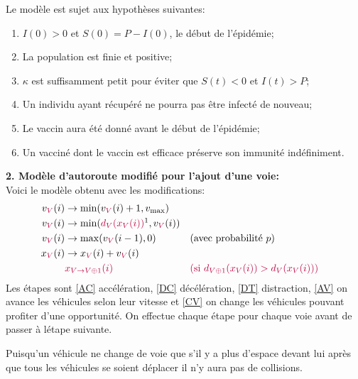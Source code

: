 \documentclass[12pt,leqno]{article}
\newcommand\modif{\color{purple}}
\begin{document}
\noindent
Le mod\`ele est sujet aux hypoth\`eses suivantes:
\begin{enumerate}
    \item $I(0) > 0$ et $S(0) = P-I(0)$, le d\'ebut de l'\'epid\'emie;
    \item La population est finie et positive;
    \item $\kappa$ est suffisamment petit pour \'eviter que $S(t) < 0$ et $I(t) > P$;
    \item Un individu ayant r\'ecup\'er\'e ne pourra pas \^etre infect\'e de nouveau;
    \modif\item Le vaccin aura \'et\'e donn\'e avant le d\'ebut de l'\'epid\'emie;
    \modif\item Un vaccin\'e dont le vaccin est efficace pr\'eserve son immunit\'e ind\'efiniment.
\end{enumerate}

\clearpage


\noindent
{\bfseries 2. Mod\`ele d'autoroute modifi\'e pour l'ajout d'une voie:}\\
Voici le mod\`ele obtenu avec les {\modif modifications}:
\begin{alignat}{3}
    v_{\modif V}(i) &\to \min(v_{\modif V}(i)+1,v_{\max})\label{AC}\\
    v_{\modif V}(i) &\to \min({\modif d_V(x_V(i))}\footnotemark, v_{\modif V}(i))\label{DC}\\
    v_{\modif V}(i) &\to \max(v_{\modif V}(i-1),0) &{}&\text{(avec probabilit\'e $p$)}\label{DT}\\
    x_{\modif V}(i) &\to x_{\modif V}(i) + v_{\modif V}(i)\label{AV}\\
    &\modif x_{V \to V\oplus 1}(i)
        &{}&\modif\text{(si $d_{V \oplus 1}(x_V(i)) > d_V(x_V(i))$)}\label{CV}
\end{alignat}
Les \'etapes sont \eqref{AC} acc\'el\'eration,
\eqref{DC} d\'ec\'el\'eration,
\eqref{DT} distraction,
\eqref{AV} on avance les v\'ehicules selon leur vitesse et
\eqref{CV} on change les v\'ehicules pouvant profiter d'une opportunit\'e. On effectue chaque \'etape pour chaque voie avant de passer \`a l\'etape suivante.

Puisqu'un v\'ehicule ne change de voie que s'il y a plus d'espace devant lui apr\`es que tous les
v\'ehicules se soient d\'eplacer il n'y aura pas de collisions.
\end{document}
